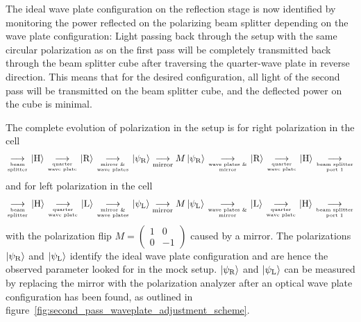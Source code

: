The ideal wave plate configuration on the reflection stage is now identified by monitoring the power reflected on the polarizing beam splitter depending on the wave plate configuration: Light passing back through the setup with the same circular polarization as on the first pass will be completely transmitted back through the beam splitter cube after traversing the quarter-wave plate in reverse direction. This means that for the desired configuration, all light of the second pass will be transmitted on the beam splitter cube, and the deflected power on the cube is minimal.

The complete evolution of polarization in the setup is for right polarization in the cell
\begin{align}
    \label{eq:second_pass_waveplate_adjustment_cascade_r}
    \underset{\text{beam}\atop\text{splitter}}{\longrightarrow}
    \Ket{\text{H}} 
    \underset{\text{quarter}\atop\text{wave plate}}{\longrightarrow}
    \Ket{\text{R}}
    \underset{\text{mirror \&} \atop \text{wave plates}}{\longrightarrow}
    \Ket{\psi_\text{R}}
    \underset{\text{mirror}}{\longrightarrow}
    M\Ket{\psi_\text{R}}
    \underset{\text{wave plates \&} \atop \text{mirror}}{\longrightarrow}
    \Ket{\text{R}}
    \underset{\text{quarter}\atop\text{wave plate}}{\longrightarrow}
    \Ket{\text{H}}
    \underset{\text{beam splitter} \atop \text{port 1}}{\longrightarrow}
\end{align}
and for left polarization in the cell
\begin{align}
    \label{eq:second_pass_waveplate_adjustment_cascade_r}
    \underset{\text{beam}\atop\text{splitter}}{\longrightarrow}
    \Ket{\text{H}} 
    \underset{\text{quarter}\atop\text{wave plate}}{\longrightarrow}
    \Ket{\text{L}}
    \underset{\text{mirror \&} \atop \text{wave plates}}{\longrightarrow}
    \Ket{\psi_\text{L}}
    \underset{\text{mirror}}{\longrightarrow}
    M\Ket{\psi_\text{L}}
    \underset{\text{wave plates \&} \atop \text{mirror}}{\longrightarrow}
    \Ket{\text{L}}
    \underset{\text{quarter}\atop\text{wave plate}}{\longrightarrow}
    \Ket{\text{H}}
    \underset{\text{beam splitter} \atop \text{port 1}}{\longrightarrow}
\end{align}
with the polarization flip $M = \left(\begin{smallmatrix}1&0\\0&-1\end{smallmatrix}\right)$ caused by a mirror. The polarizations $\Ket{\psi_\text{R}}$ and $\Ket{\psi_\text{L}}$ identify the ideal wave plate configuration and are hence the observed parameter looked for in the mock setup. $\Ket{\psi_\text{R}}$ and $\Ket{\psi_\text{L}}$ can be measured by replacing the mirror with the polarization analyzer after an optical wave plate configuration has been found, as outlined in figure~\ref{fig:second_pass_waveplate_adjustment_scheme}.

